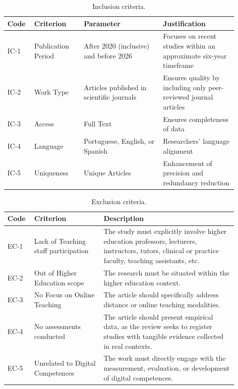 \documentclass[english]{textolivre}
\begin{document}
\begin{table}[htbp]
\centering
\caption{Inclusion criteria.}
\label{tab2}
\small
\begin{tabular}{p{0.10\linewidth} p{0.20\linewidth} p{0.32\linewidth} p{0.30\linewidth}}
\toprule
Code & Criterion & Parameter & Justification \\
\midrule
IC-1 &
Publication Period &
After 2020 (inclusive) and before 2026 &
Focuses on recent studies within an approximate six-year timeframe \\
IC-2 &
Work Type &
Articles published in scientific journals &
Ensures quality by including only peer-reviewed journal articles \\
IC-3 &
Access &
Full Text &
Ensures completeness of data \\
IC-4 &
Language &
Portuguese, English, or Spanish &
Researchers’ language alignment \\
IC-5 &
Uniqueness &
Unique Articles &
Enhancement of precision and redundancy reduction \\
\bottomrule
\end{tabular}
\end{table}

\begin{table}[htbp]
\centering
\caption{Exclusion criteria.}
\label{tab3}
\small
\begin{tabular}{p{0.10\linewidth} p{0.28\linewidth} p{0.54\linewidth}}
\toprule 
Code & Criterion & Description \\
\midrule
EC-1 &
Lack of Teaching staff participation &
The study must explicitly involve higher education professors, lecturers, instructors, tutors, clinical or practice faculty, teaching assistants, etc. \\
EC-2 &
Out of Higher Education scope &
The research must be situated within the higher education context. \\
EC-3 &
No Focus on Online Teaching &
The article should specifically address distance or online teaching modalities. \\
EC-4 &
No assessments conducted &
The article should present empirical data, as the review seeks to register studies with tangible evidence collected in real contexts. \\
EC-5 &
Unrelated to Digital Competences &
The work must directly engage with the measurement, evaluation, or development of digital competences. \\
\bottomrule
\end{tabular}
\end{table}
\end{document}
